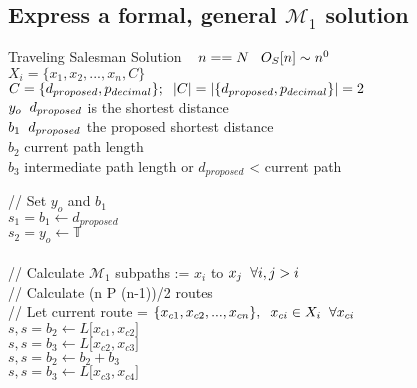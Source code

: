 \documentclass[11pt]{article}
\begin{document}
\subsection{Express a formal, general $\mathcal{M}_1$ solution}
\begin{center}
\vspace{2mm}Traveling Salesman Solution $\hspace{3mm} n == N \hspace{3mm} O_S[n] \sim n^0
$
\\ \vspace{2mm}
$
X_i = \{x_1,x_2,...,x_n,C\}
$
\\ \vspace{2mm}
$
C = \{d_{proposed},p_{decimal}\}; \hspace{2mm} |C| = |\{d_{proposed},p_{decimal}\}| = 2
$
\\ \vspace{2mm}
$
y_o \hspace{2mm} d_{proposed}$ is the shortest distance
\\ \vspace{2mm}
$
b_1 \hspace{2mm} d_{proposed}$ the proposed shortest distance
\\ \vspace{2mm}
$
b_2$ current path length
\\ \vspace{2mm}
$
b_3$ intermediate path length or $d_{proposed}$ < current path
\end{center}
// Set $y_o$ and $b_1$\\
$s_1 = b_1 \leftarrow d_{proposed}$\\
$s_2 = y_o \leftarrow \mathbb{T}$\\ \\
// Calculate $\mathcal{M}_1$ subpaths := $x_i$ to  $x_j \hspace{2mm} \forall i,j > i$\\
// Calculate (n P (n-1))/2 routes\\
// Let current route = $\{x_{c1},x_{c2},...,x_{cn}\}, \hspace{2mm} x_{ci} \in X_i \hspace{2mm} \forall x_{ci}$\\
$s,s = b_2 \leftarrow L \lbrack {x}_{c1},{x}_{c2} \rbrack$\\
$s,s = b_3 \leftarrow L \lbrack {x}_{c2},{x}_{c3} \rbrack$\\
$s,s = b_2 \leftarrow b_2 + b_3$\\
$s,s = b_3 \leftarrow L \lbrack {x}_{c3},{x}_{c4} \rbrack$\\
\end{document}
